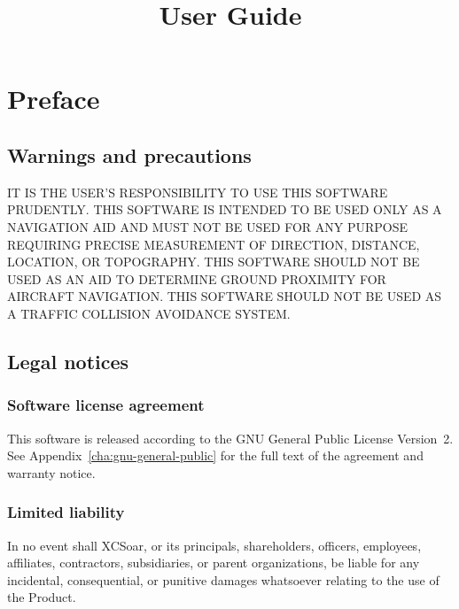 \documentclass[german,a4paper,11pt]{refrep}
\title{User Guide}%
\begin{document}
\sloppy

\maketitle

 
\begingroup
\setlength{\parskip}{0.1\baselineskip}
\tableofcontents
\endgroup


\chapter*{Preface}

\section*{Warnings and precautions}

\warning IT IS THE USER'S RESPONSIBILITY TO USE THIS SOFT\-WARE PRUDENTLY. THIS SOFTWARE IS 
INTENDED TO BE USED ONLY AS A NAVIGATION AID AND MUST NOT BE USED FOR ANY PURPOSE REQUIRING 
PRECISE MEASURE\-MENT OF DIRECTION, DISTANCE, LOCATION, OR TOPO\-GRAPHY. THIS SOFTWARE SHOULD 
NOT BE USED AS AN AID TO DETERMINE GROUND PROXIMITY FOR AIRCRAFT NAVIGATION. THIS SOFTWARE 
SHOULD NOT BE USED AS A TRAFFIC COLLISION AVOIDANCE SYSTEM.



\section*{Legal notices}

\subsection*{Software license agreement}

This software is released according to the GNU General Public License
Version~2.  See Appendix~\ref{cha:gnu-general-public} for the full
text of the agreement and warranty notice.

\subsection*{Limited liability}

In no event shall XCSoar, or its principals, shareholders, officers,
employees, affiliates, contractors, subsidiaries, or parent
organizations, be liable for any incidental, consequential, or
punitive damages whatsoever relating to the use of the Product.
\end{document}
